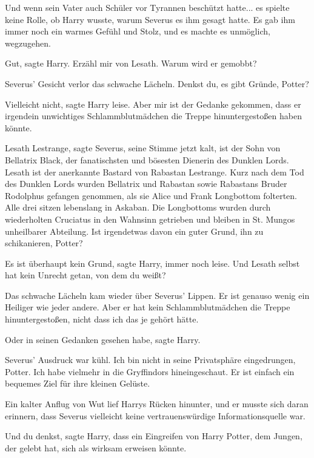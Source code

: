Und wenn sein Vater auch Schüler vor Tyrannen beschützt hatte... es spielte
keine Rolle, ob Harry wusste, warum Severus es ihm gesagt hatte. Es gab ihm
immer noch ein warmes Gefühl und Stolz, und es machte es unmöglich, wegzugehen.

\glqq{}Gut\grqq{}, sagte Harry. \glqq{}Erzähl mir von Lesath. Warum wird er
gemobbt?\grqq{}

Severus' Gesicht verlor das schwache Lächeln. \glqq{}Denkst du, es gibt Gründe,
Potter?\grqq{}

\glqq{}Vielleicht nicht\grqq{}, sagte Harry leise. \glqq{}Aber mir ist der
Gedanke gekommen, dass er irgendein unwichtiges Schlammblutmädchen die Treppe
hinuntergestoßen haben könnte.\grqq{}

\glqq{}Lesath Lestrange\grqq{}, sagte Severus, seine Stimme jetzt kalt,
\glqq{}ist der Sohn von Bellatrix Black, der fanatischsten und bösesten Dienerin
des Dunklen Lords. Lesath ist der anerkannte Bastard von Rabastan Lestrange.
Kurz nach dem Tod des Dunklen Lords wurden Bellatrix und Rabastan sowie
Rabastans Bruder Rodolphus gefangen genommen, als sie Alice und Frank Longbottom
folterten. Alle drei sitzen lebenslang in Askaban. Die Longbottoms wurden durch
wiederholten Cruciatus in den Wahnsinn getrieben und bleiben in St. Mungos
unheilbarer Abteilung. Ist irgendetwas davon ein guter Grund, ihn zu
schikanieren, Potter?\grqq{}

\glqq{}Es ist überhaupt kein Grund\grqq{}, sagte Harry, immer noch leise.
\glqq{}Und Lesath selbst hat kein Unrecht getan, von dem du weißt?\grqq{}

Das schwache Lächeln kam wieder über Severus' Lippen. \glqq{}Er ist genauso
wenig ein Heiliger wie jeder andere. Aber er hat kein Schlammblutmädchen die
Treppe hinuntergestoßen, nicht dass ich das je gehört hätte.\grqq{}

\glqq{}Oder in seinen Gedanken gesehen habe\grqq{}, sagte Harry.

Severus' Ausdruck war kühl. \glqq{}Ich bin nicht in seine Privatsphäre
eingedrungen, Potter. Ich habe vielmehr in die Gryffindors hineingeschaut. Er
ist einfach ein bequemes Ziel für ihre kleinen Gelüste.\grqq{}

Ein kalter Anflug von Wut lief Harrys Rücken hinunter, und er musste sich daran
erinnern, dass Severus vielleicht keine vertrauenswürdige Informationsquelle
war.

\glqq{}Und du denkst\grqq{}, sagte Harry, \glqq{}dass ein Eingreifen von Harry
Potter, dem Jungen, der gelebt hat, sich als wirksam erweisen könnte.\grqq{}

